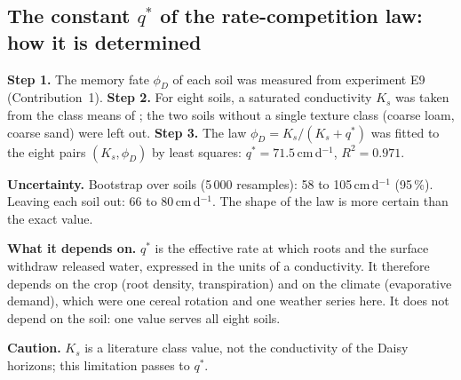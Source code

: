 \subsection{The constant $q^\ast$ of the rate-competition law: how it is determined}
\begin{derivation}[title={How $q^\ast$ was determined, step by step}]
\textbf{Step 1.} The memory fate $\phi_D$ of each soil was measured from experiment E9 (Contribution~1). \textbf{Step 2.} For eight soils, a saturated conductivity $K_s$ was taken from the class means of \citet{Carsel1988}; the two soils without a single texture class (coarse loam, coarse sand) were left out. \textbf{Step 3.} The law $\phi_D=K_s/(K_s+q^\ast)$ was fitted to the eight pairs $(K_s,\phi_D)$ by least squares: $q^\ast=71.5$\,cm\,d$^{-1}$, $R^2=0.971$.
\end{derivation}
\begin{keyresult}[title={How certain $q^\ast$ is and what it depends on}]
\textbf{Uncertainty.} Bootstrap over soils (5\,000 resamples): 58 to 105\,cm\,d$^{-1}$ (95\,\%). Leaving each soil out: 66 to 80\,cm\,d$^{-1}$. The shape of the law is more certain than the exact value.

\textbf{What it depends on.} $q^\ast$ is the effective rate at which roots and the surface withdraw released water, expressed in the units of a conductivity. It therefore depends on the crop (root density, transpiration) and on the climate (evaporative demand), which were one cereal rotation and one weather series here. It does not depend on the soil: one value serves all eight soils.

\textbf{Caution.} $K_s$ is a literature class value, not the conductivity of the Daisy horizons; this limitation passes to $q^\ast$.
\end{keyresult}
